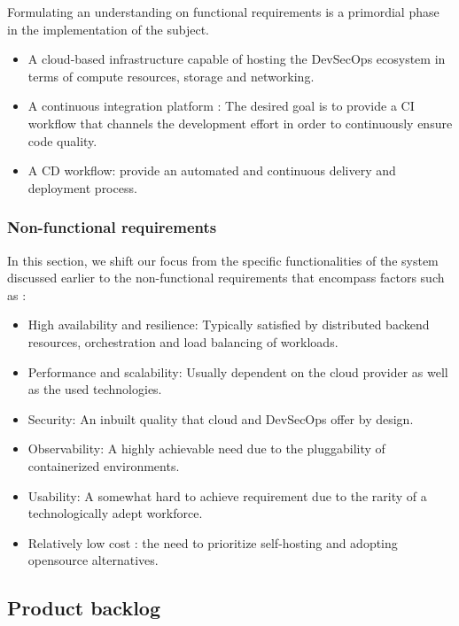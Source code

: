 \hspace{7mm}Formulating an understanding on functional requirements is a primordial phase in the implementation of the subject.

\begin{itemize}[label={--}]
\item A cloud-based infrastructure capable of hosting the DevSecOps ecosystem in terms of compute resources, storage and networking.
\item A continuous integration platform : The desired goal is to provide a CI workflow that channels the development effort in order to continuously ensure code quality.
\item A CD workflow: provide an automated and continuous delivery and deployment process.
\end{itemize}

\subsubsection{Non-functional requirements}

\hspace{7mm}In this section, we shift our focus from the specific functionalities of the system discussed earlier to the non-functional requirements that encompass factors such as :

\begin{itemize}[label={--}]
\item High availability and resilience: Typically satisfied by distributed backend resources, orchestration and load balancing of workloads. 
\item Performance and scalability: Usually dependent on the cloud provider as well as the used technologies.
\item Security: An inbuilt quality that cloud and DevSecOps offer by design.
\item Observability: A highly achievable need due to the pluggability of containerized environments.
\item Usability: A somewhat hard to achieve requirement due to the rarity of a technologically adept workforce. 
\item Relatively low cost : the need to prioritize self-hosting and adopting opensource alternatives.
\end{itemize}

\newpage
\subsection{Product backlog }

